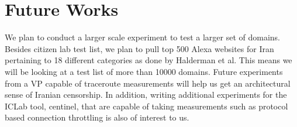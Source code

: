 \section{Future Works}\label{sec:futureworks}
We plan to conduct a larger scale experiment to test a larger set of domains. Besides citizen lab test list, we plan to pull top 500 Alexa websites for Iran pertaining to 18 different categories as done by Halderman et al. This means we will be looking at a test list of more than 10000 domains. Future experiments from a VP capable of traceroute measurements will help us get an architectural sense of Iranian censorship. In addition, writing additional experiments for the ICLab tool, centinel, that are capable of taking measurements such as protocol based connection throttling is also of interest to us. 